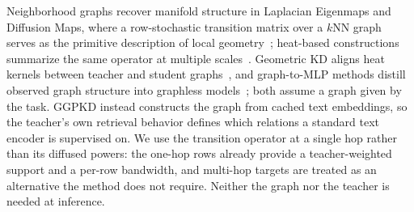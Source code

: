 Neighborhood graphs recover manifold structure in Laplacian Eigenmaps and
Diffusion Maps, where a row-stochastic transition matrix over a $k$NN graph
serves as the primitive description of local geometry~\citep{belkin2003laplacian,coifman2006diffusionmaps};
heat-based constructions summarize the same operator at multiple
scales~\citep{sun2009hks,huguet2023heatgeo}. Geometric KD aligns heat kernels
between teacher and student graphs~\citep{yang2022geometrickd}, and graph-to-MLP
methods distill observed graph structure into graphless
models~\citep{zhang2022glnn,yang2023graphkd_survey}; both assume a graph given by
the task. GGPKD instead constructs the graph from cached text embeddings, so the
teacher's own retrieval behavior defines which relations a standard text encoder
is supervised on. We use the transition operator at a single hop rather than its
diffused powers: the one-hop rows already provide a teacher-weighted support and
a per-row bandwidth, and multi-hop targets are treated as an alternative the
method does not require. Neither the graph nor the teacher is needed at
inference.
